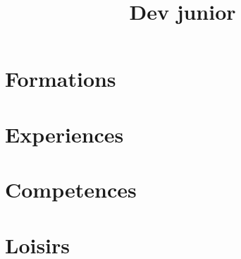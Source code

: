 \documentclass[11pt,a4paper]{moderncv}
\title{Dev junior}
\begin{document}
\makecvtitle
\section{Formations}
\section{Experiences}
\section{Competences}
\section{Loisirs}
\end{document}
